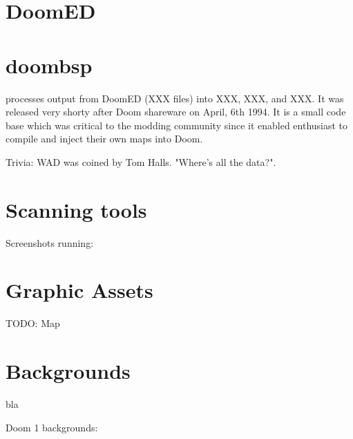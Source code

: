\section{DoomED}
\par
{}
\par
{}
\par
{}

\section{doombsp}
 processes output from DoomED (XXX files) into XXX, XXX, and XXX. It was released very shorty after Doom shareware on April, 6th 1994. It is a small code base which was critical to the modding community since it enabled enthusiast to compile and inject their own maps into Doom.\\
\par
{}
\par
Trivia: WAD was coined by Tom Halls. "Where's all the data?".
\section{Scanning tools}
\par
Screenshots running:\\
\par


\section{Graphic Assets}
\par
TODO: Map
\par
{}
\par
{}

\par
\section{Backgrounds}
bla

Doom 1 backgrounds:\\
\par
{}\\
\\
\\

